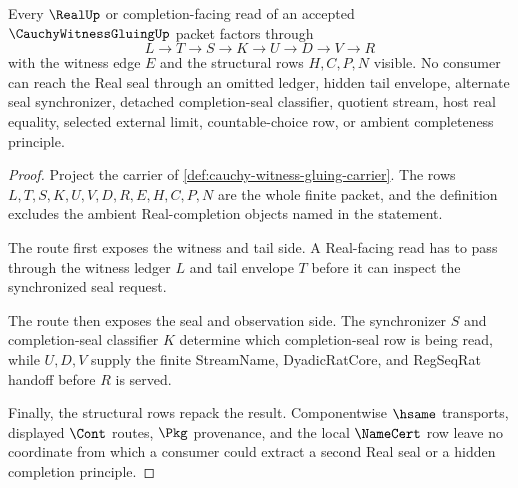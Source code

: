\begin{theorem}
\label{thm:cauchy-witness-gluing-real-seal-nonescape}
Every $\RealUp$ or completion-facing read of an accepted $\CauchyWitnessGluingUp$ packet factors through
$$
L \to T \to S \to K \to U \to D \to V \to R
$$
with the witness edge $E$ and the structural rows $H,C,P,N$ visible. No consumer can reach the Real seal through an omitted ledger, hidden tail envelope, alternate seal synchronizer, detached completion-seal classifier, quotient stream, host real equality, selected external limit, countable-choice row, or ambient completeness principle.
\end{theorem}
\begin{proof}
Project the carrier of \autoref{def:cauchy-witness-gluing-carrier}. The rows $L,T,S,K,U,V,D,R,E,H,C,P,N$ are the whole finite packet, and the definition excludes the ambient Real-completion objects named in the statement.

The route first exposes the witness and tail side. A Real-facing read has to pass through the witness ledger $L$ and tail envelope $T$ before it can inspect the synchronized seal request.

The route then exposes the seal and observation side. The synchronizer $S$ and completion-seal classifier $K$ determine which completion-seal row is being read, while $U,D,V$ supply the finite StreamName, DyadicRatCore, and RegSeqRat handoff before $R$ is served.

Finally, the structural rows repack the result. Componentwise $\hsame$ transports, displayed $\Cont$ routes, $\Pkg$ provenance, and the local $\NameCert$ row leave no coordinate from which a consumer could extract a second Real seal or a hidden completion principle.
\end{proof}

